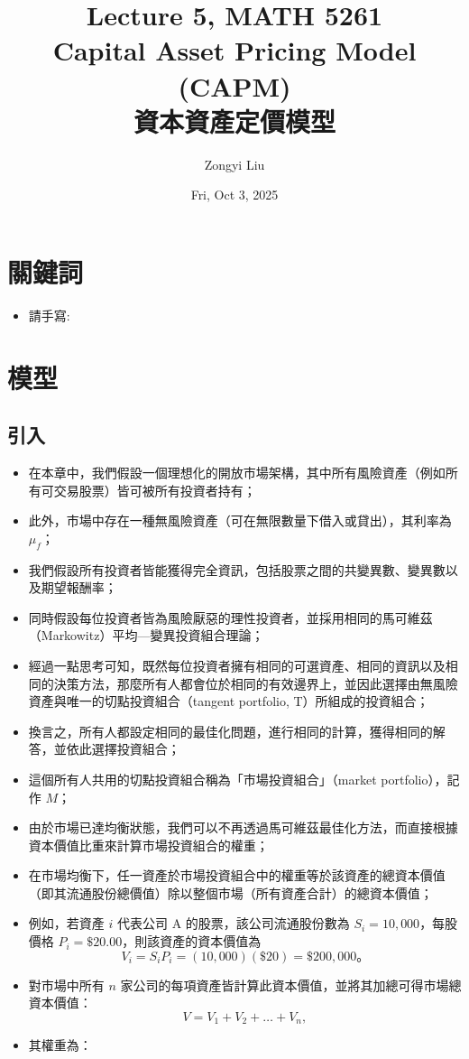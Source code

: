 \documentclass[letterpaper]{article}
\title{Lecture 5, MATH 5261 \\
		\small{Capital Asset Pricing Model (CAPM)\\
			資本資產定價模型
		}
	}
\author{Zongyi Liu}
\date{Fri, Oct 3, 2025}
\begin{document}
	\maketitle
	
	\tableofcontents
	
	\section{關鍵詞}
	\begin{itemize}
		\item 請手寫:
	\end{itemize}



\section{模型}
\subsection{引入}
\begin{itemize}
	\item 在本章中，我們假設一個理想化的開放市場架構，其中所有風險資產（例如所有可交易股票）皆可被所有投資者持有；
	\item 此外，市場中存在一種無風險資產（可在無限數量下借入或貸出），其利率為 $\mu_{f}$；
	\item 我們假設所有投資者皆能獲得完全資訊，包括股票之間的共變異數、變異數以及期望報酬率；
	\item 同時假設每位投資者皆為風險厭惡的理性投資者，並採用相同的馬可維茲（Markowitz）平均—變異投資組合理論；
	\item 經過一點思考可知，既然每位投資者擁有相同的可選資產、相同的資訊以及相同的決策方法，那麼所有人都會位於相同的有效邊界上，並因此選擇由無風險資產與唯一的切點投資組合（tangent portfolio, T）所組成的投資組合；
	\item 換言之，所有人都設定相同的最佳化問題，進行相同的計算，獲得相同的解答，並依此選擇投資組合；
	\item 這個所有人共用的切點投資組合稱為「市場投資組合」（market portfolio），記作 $M$；
	\item 由於市場已達均衡狀態，我們可以不再透過馬可維茲最佳化方法，而直接根據資本價值比重來計算市場投資組合的權重；
	\item 在市場均衡下，任一資產於市場投資組合中的權重等於該資產的總資本價值（即其流通股份總價值）除以整個市場（所有資產合計）的總資本價值；
	\item 例如，若資產 $i$ 代表公司 A 的股票，該公司流通股份數為 $S_{i}=10{,}000$，每股價格 $P_{i}=\$20.00$，則該資產的資本價值為
	$$V_{i} = S_{i} P_{i} = (10{,}000)(\$20) = \$200{,}000。$$
	\item 對市場中所有 $n$ 家公司的每項資產皆計算此資本價值，並將其加總可得市場總資本價值：
	$$V = V_{1} + V_{2} + \ldots + V_{n},$$
	\item 其權重為：
\end{itemize}
\end{document}
